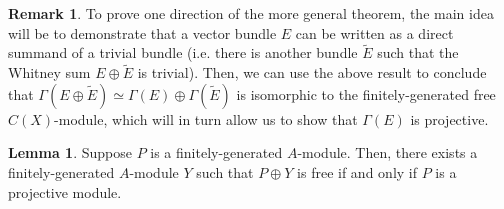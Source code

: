 \documentclass[aps,pra,showpacs,notitlepage,onecolumn,superscriptaddress,nofootinbib]{revtex4-1}
\theoremstyle{definition}
\newtheorem{lemma}{Lemma}[section]
\newtheorem{remark}{Remark}[section]
\begin{document}
\begin{remark}
  To prove one direction of the more general theorem, the main idea will be to demonstrate that a vector bundle $E$ can be written as a direct summand of a trivial bundle (i.e. there is another bundle $\widetilde{E}$ such that
  the Whitney sum $E \oplus \widetilde{E}$ is trivial). Then, we can use the above result to conclude that $\Gamma(E \oplus \widetilde{E}) \simeq \Gamma(E) \oplus \Gamma(\widetilde{E})$ is isomorphic to the finitely-generated free $C(X)$-module,
  which will in turn allow us to show that $\Gamma(E)$ is projective.
\end{remark}

\begin{lemma}
  Suppose $P$ is a finitely-generated $A$-module. Then, there exists a finitely-generated $A$-module $Y$ such that $P \oplus Y$ is free if and only if $P$ is a projective module.
\end{lemma}
\end{document}
